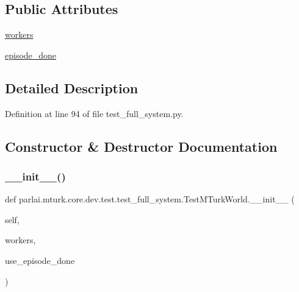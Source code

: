 \subsection*{Public Attributes}
\begin{DoxyCompactItemize}
\item 
\hyperlink{classparlai_1_1mturk_1_1core_1_1dev_1_1test_1_1test__full__system_1_1TestMTurkWorld_abc8cda139731454801c07fcfec2a36b2}{workers}
\item 
\hyperlink{classparlai_1_1mturk_1_1core_1_1dev_1_1test_1_1test__full__system_1_1TestMTurkWorld_a2a95e6618784cdab5f276f557bfee83e}{episode\+\_\+done}
\end{DoxyCompactItemize}


\subsection{Detailed Description}


Definition at line 94 of file test\+\_\+full\+\_\+system.\+py.



\subsection{Constructor \& Destructor Documentation}
\mbox{\label{classparlai_1_1mturk_1_1core_1_1dev_1_1test_1_1test__full__system_1_1TestMTurkWorld_a8f1fd9499cb38bca0fbb4711b047e47b}} 
\subsubsection{\texorpdfstring{\+\_\+\+\_\+init\+\_\+\+\_\+()}{\_\_init\_\_()}}
{\footnotesize\ttfamily def parlai.\+mturk.\+core.\+dev.\+test.\+test\+\_\+full\+\_\+system.\+Test\+M\+Turk\+World.\+\_\+\+\_\+init\+\_\+\+\_\+ (\begin{DoxyParamCaption}\item[{}]{self,  }\item[{}]{workers,  }\item[{}]{use\+\_\+episode\+\_\+done }\end{DoxyParamCaption})}



